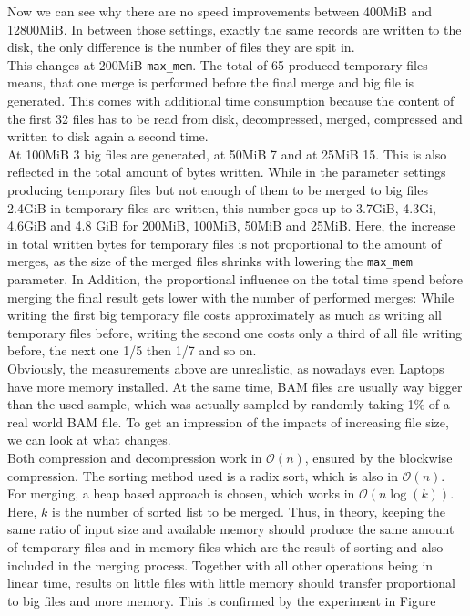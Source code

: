 Now we can see why there are no speed improvements between 400MiB and 12800MiB. In between those settings, exactly the same records are written to the disk, the only difference is the number of files they are spit in. \\
This changes at 200MiB \texttt{max\_mem}. The total of 65 produced temporary files means, that one merge is performed before the final merge and big file is generated. This comes with additional time consumption because the content of the first 32 files has to be read from disk, decompressed, merged, compressed  and written to disk again a second time. \\
At 100MiB 3 big files are generated, at 50MiB 7 and at 25MiB 15. This is also reflected in the total amount of bytes written. While in the parameter settings producing temporary files but not enough of them to be merged to big files 2.4GiB in temporary files are written, this number goes up to 3.7GiB, 4.3Gi, 4.6GiB and 4.8 GiB for 200MiB, 100MiB, 50MiB and 25MiB. Here, the increase in total written bytes for temporary files is not proportional to the amount of merges, as the size of the merged files shrinks with lowering the \texttt{max\_mem} parameter. In Addition, the proportional influence on the total time spend before merging the final result gets lower with the number of performed merges: While writing the first big temporary file costs approximately as much as writing all temporary files before, writing the second one costs only a third of all file writing before, the next one 1/5 then 1/7 and so on.\\
Obviously, the measurements above are unrealistic, as nowadays even Laptops have more memory installed. At the same time, BAM files are usually way bigger than the used sample, which was actually sampled by randomly taking 1\% of a real world BAM file. To get an impression of the impacts of increasing file size, we can look at what changes. \\
Both compression and decompression work in $\mathcal{O}(n)$, ensured by the blockwise compression. The sorting method used is a radix sort, which is also in $\mathcal{O}(n)$. For merging, a heap based approach is chosen, which works in $\mathcal{O}(n \log(k))$. Here, $k$ is the number of sorted list to be merged. Thus, in theory, keeping the same ratio of input size and available memory should produce the same amount of temporary files and in memory files which are the result of sorting and also included in the merging process. Together with all other operations being in linear time, results on little files with little memory should transfer proportional to big files and more memory. This is confirmed by the experiment in Figure \\
